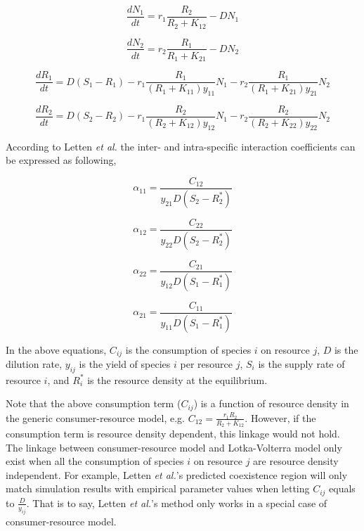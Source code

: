 \documentclass[fleqn]{article}
\begin{document}
\begin{equation}\label{eq:6}
 \frac{dN_1}{dt} = r_1\frac{R_2}{R_2+K_{12}} - DN_1
\end{equation}

\begin{equation}\label{eq:7}
 \frac{dN_2}{dt} = r_2\frac{R_1}{R_1+K_{21}} - DN_2
\end{equation}

\begin{equation}\label{eq:8}
 \frac{dR_1}{dt} = D(S_1 - R_1) - r_1\frac{R_1}{(R_1 + K_{11})y_11}N_1 - r_2\frac{R_1}{(R_1 + K_{21})y_21}N_2
\end{equation}

\begin{equation}\label{eq:9}
 \frac{dR_2}{dt} = D(S_2 - R_2) - r_1\frac{R_2}{(R_2 + K_{12})y_12}N_1 - r_2\frac{R_2}{(R_2 + K_{22})y_22}N_2
\end{equation}

According to Letten \textit{et al.} the inter- and intra-specific interaction coefficients can be expressed as following, 

\begin{equation}\label{eq:10}
 \alpha_{11} = \frac{C_{12}}{y_{21} D (S_2 - R^*_2)} 
\end{equation}

\begin{equation}\label{eq:11}
 \alpha_{12} = \frac{C_{22}}{y_{22} D (S_2 - R^*_2)} 
\end{equation}

\begin{equation}\label{eq:12}
 \alpha_{22} = \frac{C_{21}}{y_{12} D (S_1 - R^*_1)} 
\end{equation}

\begin{equation}\label{eq:13}
 \alpha_{21} = \frac{C_{11}}{y_{11} D (S_1 - R^*_1)} 
\end{equation}

\noindent In the above equations, $C_{ij}$ is the consumption of species $i$ on resource $j$, $D$ is the dilution rate, $y_{ij}$ is the yield of species $i$ per resource $j$, $S_{i}$ is the supply rate of resource $i$, and $R^*_i$ is the resource density at the equilibrium. 

Note that the above consumption term ($C_{ij}$) is a function of resource density in the generic consumer-resource model, e.g. $C_{12} = \frac{r_1R_2}{R_2 + K_{12}}$. However, if the consumption term is resource density dependent, this linkage would not hold. The linkage between consumer-resource model and Lotka-Volterra model only exist when all the consumption of species $i$ on resource $j$ are resource density independent. For example, Letten \textit{et al.}'s predicted coexistence region will only match simulation results with empirical parameter values when letting $C_{ij}$ equals to $\frac{D}{y_{ij}}$. That is to say, Letten \textit{et al.}'s method only works in a special case of consumer-resource model.  
 





\newpage


\end{document}
